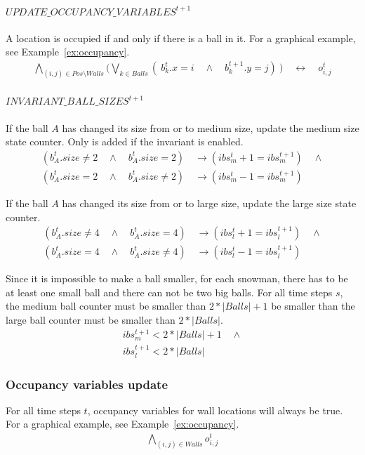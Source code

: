 \documentclass{report}
\theoremstyle{plain}
\begin{document}
\paragraph{$UPDATE\_OCCUPANCY\_VARIABLES^{t+1}$}
A location is occupied if and only if there is a ball in it. For a graphical example, see Example~\ref{ex:occupancy}.
\begin{align*}
\bigwedge \limits_{(i, j) \in Pos \setminus Walls} \big(\bigvee \limits_{k \in Balls} (\ b_k^t.x = i \quad \wedge \quad b_k^{t+1}.y = j)\ \big) \quad \leftrightarrow \quad o_{i,j}^t 
\end{align*}

\paragraph{$INVARIANT\_BALL\_SIZES^{t+1}$}
If the ball $A$ has changed its size from or to medium size, update the medium size state counter. Only is added if the invariant is enabled.
\begin{align*}
(b_A^t.size \neq 2 \quad \wedge \quad b_A^t.size = 2) \quad \rightarrow (ibs_m^t + 1 = ibs_m^{t + 1}) \quad \wedge \\
(b_A^t.size = 2 \quad \wedge \quad b_A^t.size \neq 2) \quad \rightarrow (ibs_m^t - 1 = ibs_m^{t + 1})
\end{align*}

If the ball $A$ has changed its size from or to large size, update the large size state counter.
\begin{align*}
(b_A^t.size \neq 4 \quad \wedge \quad b_A^t.size = 4) \quad \rightarrow (ibs_l^t + 1 = ibs_l^{t + 1}) \quad \wedge \\
(b_A^t.size = 4 \quad \wedge \quad b_A^t.size \neq 4) \quad \rightarrow (ibs_l^t - 1 = ibs_l^{t + 1})
\end{align*}

Since it is impossible to make a ball smaller, for each snowman, there has to be at least one small ball and there can not be two big balls. For all time steps $s$, the medium ball counter must be smaller than $2 * |Balls| + 1$ be smaller than the large ball counter must be smaller than $2 * |Balls|$.
\begin{align*}
ibs_m^{t + 1} < 2 * |Balls| + 1  \quad \wedge \\
ibs_l^{t + 1} < 2 * |Balls|
\end{align*}


\subsubsection{Occupancy variables update}
For all time steps $t$, occupancy variables for wall locations will always be true. For a graphical example, see Example~\ref{ex:occupancy}.
\begin{gather*}
\bigwedge \limits_{(i, j) \in Walls} o_{i,j}^t
\end{gather*}
\end{document}
